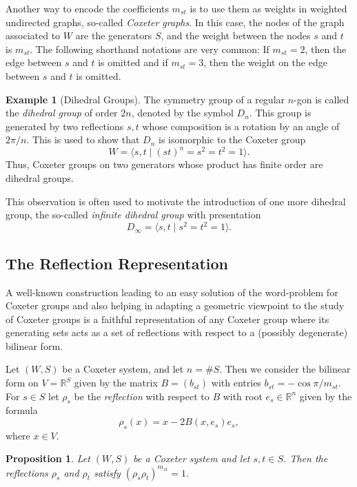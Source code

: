 \documentclass{article}
\newtheorem{proposition}[theorem]{Proposition}
\theoremstyle{definition}
\newtheorem{example}[theorem]{Example}
\begin{document}
Another way to encode the coefficients $m_{st}$ is to use them as weights in weighted undirected graphs, so-called \textit{Coxeter graphs}. In this case, the nodes of the graph associated to $W$ are the generators $S$, and the weight between the nodes $s$ and $t$ is $m_{st}$. The following shorthand notations are very common: If $m_{st} = 2$, then the edge between $s$ and $t$ is omitted and if $m_{st} = 3$, then the weight on the edge between $s$ and $t$ is omitted.

\begin{example}[Dihedral Groups]
The symmetry group of a regular $n$-gon is called the 
\textit{dihedral group} of order $2n$, denoted by the symbol $D_n$. This group is generated by two reflections 
$s, t$ whose composition is a rotation by an angle 
of~$2\pi/n$. This is used to show that $D_n$ 
is isomorphic to the Coxeter group
$$W = \langle s, t \; | \; (st)^n = s^2 = t^2 = 1 \rangle.$$
Thus, Coxeter groups on two generators whose product has finite order are dihedral groups.

This observation is often used to motivate the introduction of one more dihedral group, the so-called \textit{infinite dihedral group} with presentation
$$D_\infty = \langle s, t \; | \; s^2 = t^2 = 1 \rangle.$$
\end{example}
\subsection{The Reflection Representation}
A well-known construction leading to an easy solution of the word-problem for Coxeter groups and also helping in adapting a geometric viewpoint to the study of Coxeter groups is a faithful representation of any Coxeter group where its generating sets acts as a set of reflections with respect to a (possibly degenerate) bilinear form.

Let $(W,S)$ be a Coxeter system, and let $n = \#S$. Then we consider the bilinear form on $V = \mathbb{R}^S$ given by the matrix $B = (b_{st})$ with entries $b_{st} = -\cos \pi/m_{st}$. 
For $s \in S$ let $\rho_s$ be the \textit{reflection} with respect to $B$ with root $e_s \in \mathbb{R}^n$ given by the formula
$$ \rho_s(x) = x - 2B(x, e_s)e_s,$$
where $x \in V$.

\begin{proposition}\label{prop:reflection-representation-well-defined}
Let $(W,S)$ be a Coxeter system and let $s, t \in S$. Then the reflections $\rho_s$ and $\rho_t$ satisfy $(\rho_s \rho_t)^{m_{st}} = 1$.
\end{proposition}
\end{document}
